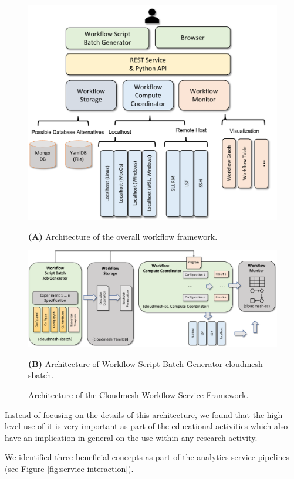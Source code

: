 \documentclass[utf8]{FrontiersinVancouver} %
\begin{document}
\begin{figure}[htb]
    \centering\includegraphics[width=0.70\columnwidth]{images/cloudmesh-cc-new}
    
    {\bf (A)} Architecture of the overall workflow framework.

\bigskip\bigskip
    
    \centering\includegraphics[width=1.0\columnwidth]{images/cloudmesh-sbatch-new}
    
    
    {\bf (B)} Architecture of Workflow Script Batch Generator cloudmesh-sbatch.

    \caption{Architecture of the Cloudmesh Workflow Service Framework.}
    \label{fig:cc-2}

\end{figure}

Instead of focusing on the details of this architecture, we found that the high-level use of it is very important as part of the educational activities which also have an implication in general on the use within any research activity.

We identified three beneficial concepts as part of the analytics service pipelines (see Figure \ref{fig:service-interaction}).
\end{document}
